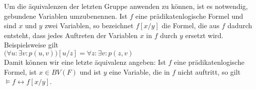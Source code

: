 Um die \"{a}quivalenzen der letzten Gruppe anwenden zu k\"{o}nnen, ist es notwendig,
gebundene Variablen umzubenennen. Ist $f$ eine pr\"{a}dikatenlogische Formel und sind $x$ und
$y$ zwei Variablen, so bezeichnet $f[x/y]$ die Formel, die aus $f$ dadurch entsteht, dass
jedes Auftreten der Variablen $x$ in $f$ durch $y$ ersetzt wird.  Beispielsweise gilt \\[0.2cm]
\hspace*{1.3cm} $\bigl(\forall u : \exists v : p(u,v)\bigr)[u/z] = \forall z : \exists v : p(z,v)$
\\[0.2cm]
Damit k\"{o}nnen wir eine letzte \"{a}quivalenz angeben: Ist $f$ eine pr\"{a}dikatenlogische Formel,
ist $x \in BV(F)$ und ist $y$ eine Variable, die in $f$ nicht auftritt, so gilt \\[0.2cm]
\hspace*{1.3cm} $\models f \leftrightarrow f[x/y]$.
\vspace{0.3cm}


